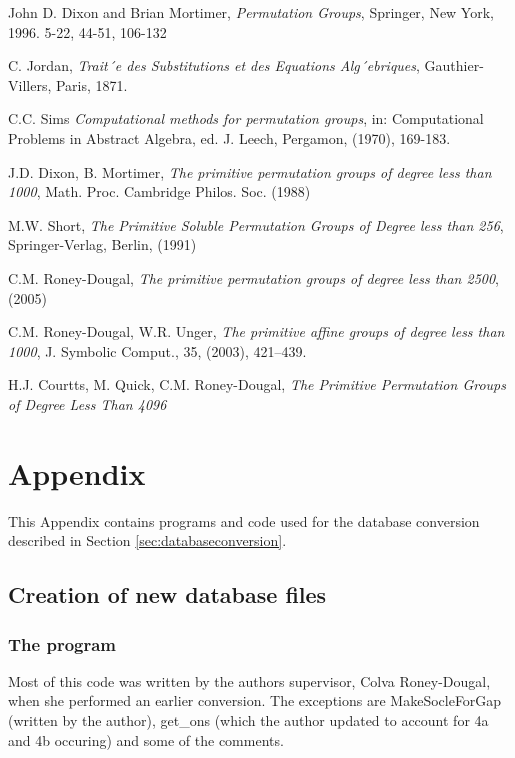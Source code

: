 \documentclass[]{article}
\theoremstyle{definition}
\begin{document}
\begin{thebibliography}{10}
	John D. Dixon and Brian Mortimer,
	\textit{Permutation Groups},
	Springer, New York, 1996. 5-22, 44-51, 106-132
	
	C. Jordan,
	\textit{Trait´e des Substitutions et des Equations Alg´ebriques},
	Gauthier-Villers, Paris, 1871.
	
	C.C. Sims
	\textit{Computational methods for permutation groups},
	in: Computational Problems in
	Abstract Algebra, ed. J. Leech, Pergamon, (1970), 169-183.
	
	J.D. Dixon, B. Mortimer,
	\textit{The primitive permutation groups of degree less than 1000},
	Math. Proc. Cambridge Philos. Soc. (1988)
	
	M.W. Short, 
	\textit{The Primitive Soluble Permutation Groups of Degree less than 256},
	Springer-Verlag, Berlin, (1991)
	
	C.M. Roney-Dougal,
	\textit{The primitive permutation groups of degree less than 2500},
	(2005)
	
	C.M. Roney-Dougal, W.R. Unger, 
	\textit{The primitive affine groups of degree less than 1000},
	J. Symbolic Comput., 35, (2003), 421–439.
	
	H.J. Courtts, M. Quick, C.M. Roney-Dougal,
	\textit{The Primitive Permutation Groups of Degree Less Than 4096}
\end{thebibliography}
\clearpage
\section{Appendix}
This Appendix contains programs and code used for the database conversion described in Section \ref{sec:databaseconversion}.

\subsection{Creation of new database files}
\subsubsection{The program}
Most of this code was written by the authors supervisor, Colva Roney-Dougal, when she performed an earlier conversion. The exceptions are MakeSocleForGap (written by the author), get\_ons (which the author updated to account for 4a and 4b occuring) and some of the comments.
\end{document}
